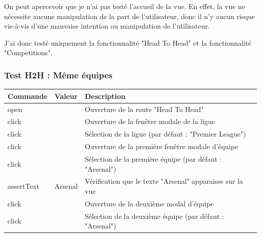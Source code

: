 \documentclass[a4paper,14pt]{extarticle}
\begin{document}
{On peut apercevoir que je n'ai pas testé l'accueil de la vue. En effet, la vue ne nécessite aucune manipulation de la part de l'utilisateur, donc il n'y aucun risque vis-à-vis d'une mauvaise intention ou manipulation de l'utilisateur.

J'ai donc testé uniquement la fonctionnalité "Head To Head" et la fonctionnalité "Competitions". 

\subsubsection{Test H2H : Même équipes}

\begin{table}[htp]
    \centering
    \begin{tabular}{|m{4cm}|m{4cm}|m{6cm}|}
    \hline
    \textbf{Commande} & \textbf{Valeur}                                      & \textbf{Description}                                                                    \\ \hline
    open              &                                                      & Ouverture de la route "Head To Head"                                           \\ \hline
    click             &                                                      & Ouverture de la fenêtre modale de la ligue                                              \\ \hline
    click             &                                                      & Sélection de la ligue (par défaut : "Premier League")                                   \\ \hline
    click             &                                                      & Ouverture de la première fenêtre modale d'équipe                                        \\ \hline
    click             &                                                      & Sélection de la première équipe (par défaut : "Arsenal")                                \\ \hline
    assertText        & Arsenal                                              & Vérification que le texte "Arsenal" apparaisse sur la vue                               \\ \hline
    click             &                                                      & Ouverture de la deuxième modal d'équipe                                                 \\ \hline
    click             &                                                      & Sélection de la deuxième équipe (par défaut : "Arsenal")                                \\ \hline

\end{tabular}
\end{table}}
\end{document}
